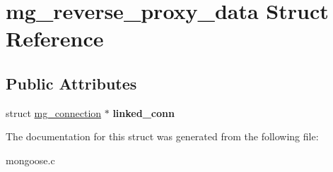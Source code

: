 \hypertarget{structmg__reverse__proxy__data}{}\section{mg\+\_\+reverse\+\_\+proxy\+\_\+data Struct Reference}
\label{structmg__reverse__proxy__data}
\subsection*{Public Attributes}
\begin{DoxyCompactItemize}
\item 
\mbox{\label{structmg__reverse__proxy__data_a085cf094cf2e4a4bd80c8082443821b5}} 
struct \hyperlink{structmg__connection}{mg\+\_\+connection} $\ast$ {\bfseries linked\+\_\+conn}
\end{DoxyCompactItemize}


The documentation for this struct was generated from the following file\+:\begin{DoxyCompactItemize}
\item 
mongoose.\+c\end{DoxyCompactItemize}
